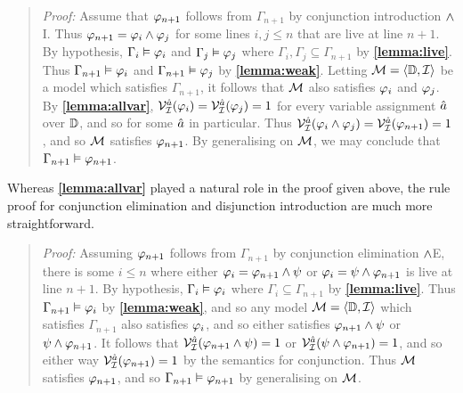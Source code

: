   
\begin{quote} 
  \textit{Proof:} Assume that $\varphi_{n+1}$ follows from $\Gamma_{n+1}$ by conjunction introduction $\wedge$I.
  Thus $\varphi_{n+1}=\varphi_i\wedge\varphi_j$ for some lines $i,j\leq n$ that are live at line $n+1$.
  By hypothesis, $\Gamma_i\vDash \varphi_i$ and $\Gamma_j\vDash \varphi_j$ where $\Gamma_i,\Gamma_j\subseteq \Gamma_{n+1}$ by \textbf{\ref{lemma:live}}.
  Thus $\Gamma_{n+1} \vDash \varphi_i$ and $\Gamma_{n+1} \vDash \varphi_j$ by \textbf{\ref{lemma:weak}}.
  Letting $\mathcal{M}=\langle\mathbb{D},\mathcal{I}\rangle$ be a model which satisfies $\Gamma_{n+1}$, it follows that $\mathcal{M}$ also satisfies $\varphi_i$ and $\varphi_j$.
  By \textbf{\ref{lemma:allvar}}, $\mathcal{V}_{\mathcal{I}}^{\hat{a}}(\varphi_i)=\mathcal{V}_{\mathcal{I}}^{\hat{a}}(\varphi_j)=1$ for every variable assignment $\hat{a}$ over $\mathbb{D}$, and so for some $\hat{a}$ in particular.
  Thus $\mathcal{V}_{\mathcal{I}}^{\hat{a}}(\varphi_i\wedge\varphi_j)=\mathcal{V}_{\mathcal{I}}^{\hat{a}}(\varphi_{n+1})=1$, and so $\mathcal{M}$ satisfies $\varphi_{n+1}$.
  By generalising on $\mathcal{M}$, we may conclude that $\Gamma_{n+1} \vDash \varphi_{n+1}$.
\end{quote}


Whereas \textbf{\ref{lemma:allvar}} played a natural role in the proof given above, the rule proof for conjunction elimination and disjunction introduction are much more straightforward.


\begin{quote} 
  \textit{Proof:} Assuming $\varphi_{n+1}$ follows from $\Gamma_{n+1}$ by conjunction elimination $\wedge$E, there is some $i\leq n$ where either $\varphi_i=\varphi_{n+1}\wedge\psi$ or $\varphi_i=\psi\wedge\varphi_{n+1}$ is live at line $n+1$.
  By hypothesis, $\Gamma_i\vDash \varphi_i$ where $\Gamma_i\subseteq \Gamma_{n+1}$ by \textbf{\ref{lemma:live}}.
  Thus $\Gamma_{n+1} \vDash \varphi_i$ by \textbf{\ref{lemma:weak}}, and so any model $\mathcal{M}=\langle\mathbb{D},\mathcal{I}\rangle$ which satisfies $\Gamma_{n+1}$ also satisfies $\varphi_i$, and so either satisfies $\varphi_{n+1}\wedge\psi$ or $\psi\wedge\varphi_{n+1}$.
  It follows that $\mathcal{V}_{\mathcal{I}}^{\hat{a}}(\varphi_{n+1}\wedge\psi)=1$ or $\mathcal{V}_{\mathcal{I}}^{\hat{a}}(\psi\wedge\varphi_{n+1})=1$, and so either way $\mathcal{V}_{\mathcal{I}}^{\hat{a}}(\varphi_{n+1})=1$ by the semantics for conjunction.
  Thus $\mathcal{M}$ satisfies $\varphi_{n+1}$, and so $\Gamma_{n+1} \vDash \varphi_{n+1}$ by generalising on $\mathcal{M}$.
\end{quote}



